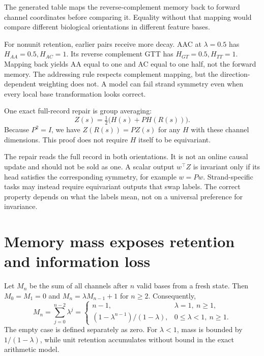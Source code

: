 \begin{center}\end{center}
The generated table maps the reverse-complement memory back to forward
channel coordinates before comparing it. Equality without that mapping
would compare different biological orientations in different feature bases.


For nonunit retention, earlier pairs receive more decay. AAC at $\lambda=0.5$
has $H_{AA}=0.5,H_{AC}=1$. Its reverse complement GTT has
$H_{GT}=0.5,H_{TT}=1$. Mapping back yields AA equal to one and AC equal
to one half, not the forward memory. The addressing rule respects complement
mapping, but the direction-dependent weighting does not. A model can fail
strand symmetry even when every local base transformation looks correct.

One exact full-record repair is group averaging:
\begin{equation}
 Z(s)=\tfrac12\bigl(H(s)+P H(R(s))\bigr).
\end{equation}
Because $P^2=I$, we have $Z(R(s))=PZ(s)$ for any $H$ with these channel
dimensions. This proof does not require $H$ itself to be equivariant.

The repair reads the full record in both orientations. It is not an online
causal update and should not be sold as one. A scalar output $w^\top Z$
is invariant only if its head satisfies the corresponding symmetry, for
example $w=P w$. Strand-specific tasks may instead require equivariant
outputs that swap labels. The correct property depends on what the labels
mean, not on a universal preference for invariance.

\section{Memory mass exposes retention and information loss}
Let $M_n$ be the sum of all channels after $n$ valid bases from a fresh state.
Then $M_0=M_1=0$ and $M_n=\lambda M_{n-1}+1$ for $n\geq2$.
Consequently,
\begin{equation}
 M_n=\sum_{j=0}^{n-2}\lambda^j=
 \begin{cases}
 n-1,&\lambda=1,\ n\geq1,\\
 (1-\lambda^{n-1})/(1-\lambda),&0\leq\lambda<1,\ n\geq1.
 \end{cases}
\end{equation}
The empty case is defined separately as zero. For $\lambda<1$, mass is
bounded by $1/(1-\lambda)$, while unit retention accumulates without bound
in the exact arithmetic model.

